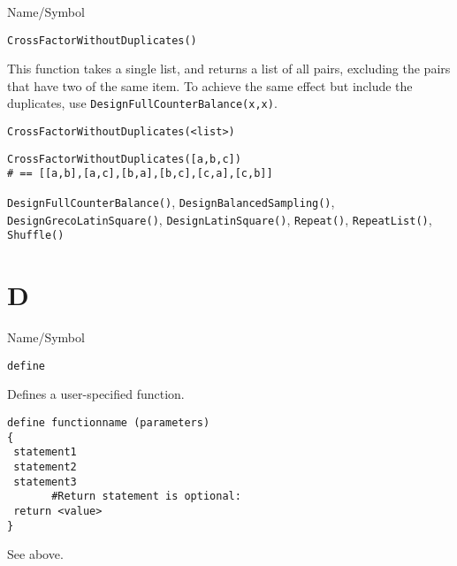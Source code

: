 \begin{desc}{Name/Symbol}
\item[Name/Symbol]  	\verb+CrossFactorWithoutDuplicates()+

\item[Description] 	This function takes a single list, and returns a list of all 
			pairs, excluding the pairs that have two of the same item. 
			To achieve the same effect but include the duplicates, use 
			\verb+DesignFullCounterBalance(x,x)+.

\item[Usage]
\begin{verbatim}
CrossFactorWithoutDuplicates(<list>)
\end{verbatim}

\item[Example]
\begin{verbatim}
CrossFactorWithoutDuplicates([a,b,c]) 
# == [[a,b],[a,c],[b,a],[b,c],[c,a],[c,b]]
\end{verbatim}

\item[See Also] \verb+DesignFullCounterBalance()+,
  \verb+DesignBalancedSampling()+, \verb+DesignGrecoLatinSquare()+,
  \verb+DesignLatinSquare()+, \verb+Repeat()+, \verb+RepeatList()+,
  \verb+Shuffle()+
\end{desc}

\rl
\section{D}
\rl


\begin{desc}{Name/Symbol}
\item[Name/Symbol]  	\verb+define+

\item[Description]  	Defines a user-specified function.

\item[Usage]
\begin{verbatim}
define functionname (parameters)
{
 statement1
 statement2
 statement3
       #Return statement is optional:
 return <value>
}
\end{verbatim}

\item[Example]    	See above.

\item[See Also]
\end{desc}   	



